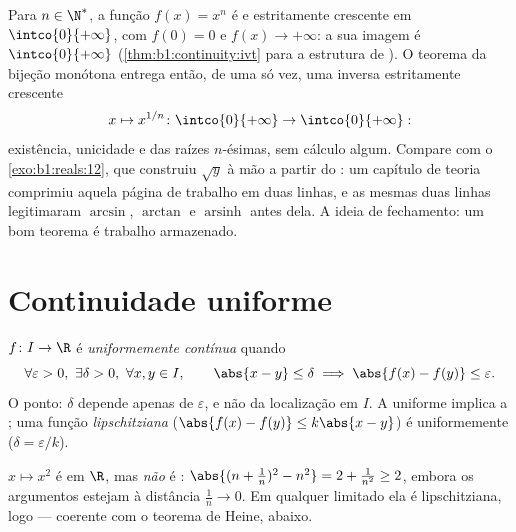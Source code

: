 \begin{example}\label{ex:b1:continuity:nthroot}
Para $n \in \N^*$, a função $f(x) = x^n$ é  e
estritamente crescente em $\intco{0}{+\infty}$, com $f(0) = 0$ e
$f(x) \to +\infty$: a sua imagem é $\intco{0}{+\infty}$
(\cref{thm:b1:continuity:ivt} para a estrutura de ). O
teorema da bijeção monótona entrega então, de uma só vez, uma
inversa \emph{} estritamente crescente
\[
x \mapsto x^{1/n} \colon \intco{0}{+\infty} \to
\intco{0}{+\infty} :
\]
existência, unicidade e  das raízes $n$-ésimas, sem
cálculo algum. Compare com o \cref{exo:b1:reals:12}, que construiu
$\sqrt y$ à mão a partir do : um capítulo de teoria
comprimiu aquela página de trabalho em duas linhas, e as mesmas duas
linhas legitimaram $\arcsin$, $\arctan$ e
$\operatorname{arsinh}$ antes dela. A ideia de fechamento: um bom
teorema é trabalho armazenado.
\end{example}

\section{Continuidade uniforme}

\begin{definition}\label{def:b1:continuity:uniform}
$f \colon I \to \R$ é \emph{uniformemente contínua} quando
\[
\forall \varepsilon > 0,\ \exists \delta > 0,\ \forall x, y \in I,
\qquad \abs{x - y} \leq \delta \implies \abs{f(x) - f(y)} \leq
\varepsilon .
\]
O ponto: $\delta$ depende apenas de $\varepsilon$, e não da
localização em $I$. A  uniforme implica a ; uma
função \emph{lipschitziana} ($\abs{f(x) - f(y)} \leq k \abs{x - y}$)
é uniformemente  ($\delta = \varepsilon/k$).
\end{definition}

\begin{example}\label{ex:b1:continuity:notuniform}
$x \mapsto x^2$ é  em $\R$, mas \emph{não} é : $\abs{(n + \frac 1n)^2 - n^2} = 2 + \frac{1}{n^2} \geq 2$,
embora os argumentos estejam à distância $\frac 1n \to 0$. Em qualquer
 limitado ela é lipschitziana, logo  ---
coerente com o teorema de Heine, abaixo.
\end{example}

